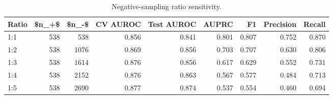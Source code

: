 \begin{table}[htbp]
\centering
\caption{Negative-sampling ratio sensitivity.}
\label{tab:robustness_recomputed}
\begin{tabular}{lrrrrrrrr}
\toprule
Ratio & \$n\_+\$ & \$n\_-\$ & CV AUROC & Test AUROC & AUPRC & F1 & Precision & Recall \\
\midrule
1:1 & 538 & 538 & 0.856 & 0.841 & 0.801 & 0.807 & 0.752 & 0.870 \\
1:2 & 538 & 1076 & 0.869 & 0.856 & 0.703 & 0.707 & 0.630 & 0.806 \\
1:3 & 538 & 1614 & 0.876 & 0.856 & 0.617 & 0.629 & 0.552 & 0.731 \\
1:4 & 538 & 2152 & 0.876 & 0.863 & 0.567 & 0.577 & 0.484 & 0.713 \\
1:5 & 538 & 2690 & 0.877 & 0.874 & 0.537 & 0.554 & 0.460 & 0.694 \\
\bottomrule
\end{tabular}

\end{table}
